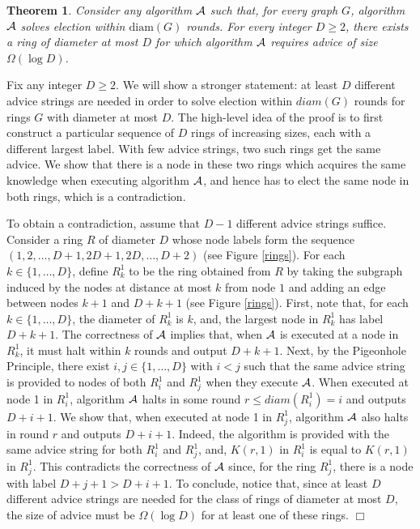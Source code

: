 \documentclass[11pt]{article}
\newtheorem{theorem}{Theorem}[section]
\newcommand{\qed}{\hfill $\Box$ \bigbreak}
\newenvironment{proof}{\noindent {\bf Proof.}}{\qed}
\newcommand{\diam}[1]{\ensuremath{{diam}(#1)}}
\begin{document}
\begin{theorem}\label{diam}
Consider any algorithm ${\cal A}$ such that, for every graph $G$, algorithm ${\cal A}$ solves election within $\mathrm{diam}(G)$ rounds. For every integer $D \geq 2$, there exists a ring of diameter at most $D$ for which algorithm ${\cal A}$ requires advice of size $\Omega(\log D)$.
\end{theorem}
\begin{proof}
Fix any integer $D \geq 2$. We will show a stronger statement: at least $D$ different advice strings are needed in order to solve election within $\diam{G}$ rounds for 
rings $G$ with diameter at most $D$. The high-level idea of the proof is to first construct a particular sequence of $D$ rings of increasing sizes, each with a different largest label.
With few advice strings, two such rings get the same advice. We show that there is a node in these two rings which acquires the same knowledge when executing algorithm $\cal A$, and hence has to elect the same node in both rings, which is a contradiction. 

To obtain a contradiction, assume that $D-1$ different advice strings suffice. Consider a ring $R$ of diameter $D$ whose node labels form the sequence $(1,2,\ldots,D+1,2D+1,2D,\ldots,D+2)$ (see Figure \ref{rings}). For each $k \in \{1,\ldots,D\}$, define $R^1_{k}$ to be the ring obtained from $R$ by taking the subgraph induced by the nodes at distance at most $k$ from node $1$ and adding an edge between nodes $k+1$ and $D+k+1$ (see Figure \ref{rings}). First, note that, for each $k \in \{1,\ldots,D\}$, the diameter of $R^1_k$ is $k$, and, the largest node in $R^1_k$ has label $D+k+1$. The correctness of ${\cal A}$ implies that, when ${\cal A}$ is executed at a node in $R^1_k$, it must halt within $k$ rounds and output $D+k+1$. Next, by the Pigeonhole Principle, there exist $i,j \in \{1,\ldots,D\}$ with $i < j$ such that the same advice string is provided to nodes of both $R^1_i$ and $R^1_{j}$ when they execute ${\cal A}$. When executed at node 1 in $R^1_i$, algorithm ${\cal A}$ halts in some round $r \leq \diam{R^1_i} = i$ and outputs $D+i+1$. We show that, when executed at node 1 in $R^1_{j}$, algorithm ${\cal A}$ also halts in round $r$ and outputs $D+i+1$. Indeed, the algorithm is provided with the same advice string for both $R^1_i$ and $R^1_{j}$, and, $K(r,1)$ in $R^1_i$ is equal to  $K(r,1)$ in $R^1_{j}$. This contradicts the correctness of ${\cal A}$ since, for the ring $R^1_{j}$, there is a node with label $D+j+1>D+i+1$. To conclude, notice that, 
since at least $D$ different advice strings are needed for the class of rings of diameter at most $D$, the size of advice must be $\Omega(\log D)$ for at least one
of these rings. 
\end{proof}
\end{document}
